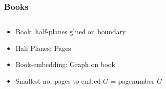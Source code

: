 \documentclass[english]{beamer}
\begin{document}
\begin{frame}
  \frametitle{Books}
  \begin{columns}
    \begin{column}{0.5\textwidth}
      \begin{itemize}
        \item Book: half-planes glued on boundary
        \item Half Planes: Pages
        \item Book-embedding: Graph on book
        \item Smallest no. pages to embed $G$ = pagenumber $G$
      \end{itemize}
    \end{column}
    \begin{column}{0.5\textwidth}
      \begin{figure}
        \centering
        
      \end{figure}
    \end{column}
  \end{columns}
\end{frame}
\end{document}
